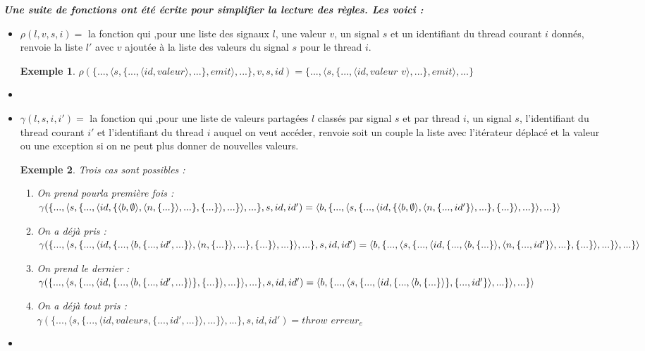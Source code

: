 \documentclass[10pt,a4paper]{report}
\newtheorem{ex}{Exemple}
\begin{document}
\textbf{\textit{Une suite de fonctions ont été écrite pour simplifier la lecture des règles. Les voici :}}
\smallbreak
\begin{itemize}
\item[] $\rho(l,v,s,i) =$ la fonction qui ,pour une liste des signaux $l$, une valeur $v$, un signal $s$ et un identifiant du thread courant $i$ donnés, renvoie la liste $l'$ avec $v$ ajoutée à la liste des valeurs du signal $s$ pour le thread $i$.
\begin{ex}
	$\rho(\{...,\langle s,\{...,\langle id,valeur\rangle,...\},emit\rangle,...\},v,s,id) = \{...,\langle s,\{...,\langle id,valeur$ $v\rangle,...\},emit\rangle,...\}$
\end{ex}
\item[] 
  
\item[] $\gamma(l,s,i,i') =$ la fonction qui ,pour une liste de valeurs partagées $l$ classés par signal $s$ et par thread $i$, un signal $s$, l'identifiant du thread courant $i'$ et l'identifiant du thread $i$ auquel on veut accéder, renvoie soit un couple la liste avec l'itérateur déplacé et la valeur ou une exception si on ne peut plus donner de nouvelles valeurs. 
\begin{ex} 
	Trois cas sont possibles :
	\begin{enumerate}
		\item On prend pourla première fois :
		\\$\gamma(\{...,\langle s,\{...,\langle id,\{\langle b,\emptyset\rangle,\langle n,\{...\}\rangle,...\},\{...\}\rangle,...\}\rangle,...\},s,id,id') = 
		\\\langle b , \{...,\langle s,\{...,\langle id,\{\langle b,\emptyset\rangle,\langle n,\{...,id'\}\rangle,...\},\{...\}\rangle,...\}\rangle,...\} \rangle$
		\item On a déjà pris :
		\\$\gamma(\{...,\langle s,\{...,\langle id,\{...,\langle b,\{...,id',...\}\rangle,\langle n,\{...\}\rangle,...\},\{...\}\rangle,...\}\rangle,...\},s,id,id') = 
		\\\langle b , \{...,\langle s,\{...,\langle id,\{...,\langle b,\{...\}\rangle,\langle n,\{...,id'\}\rangle,...\},\{...\}\rangle,...\}\rangle,...\} \rangle$
		\item On prend le dernier :
		\\$\gamma(\{...,\langle s,\{...,\langle id,\{...,\langle b,\{...,id',...\}\rangle\},\{...\}\rangle,...\}\rangle,...\},s,id,id') = 
		\\\langle b , \{...,\langle s,\{...,\langle id,\{...,\langle b,\{...\}\rangle\},\{...,id'\}\rangle,...\}\rangle,...\} \rangle$
		\item On a déjà tout pris : 
		\\$\gamma(\{...,\langle s,\{...,\langle id,valeurs,\{...,id',...\}\rangle,...\}\rangle,...\},s,id,id') = throw$ $erreur_{e}$
	\end{enumerate} 
\end{ex}
\item[]
  

\end{itemize}
\end{document}
